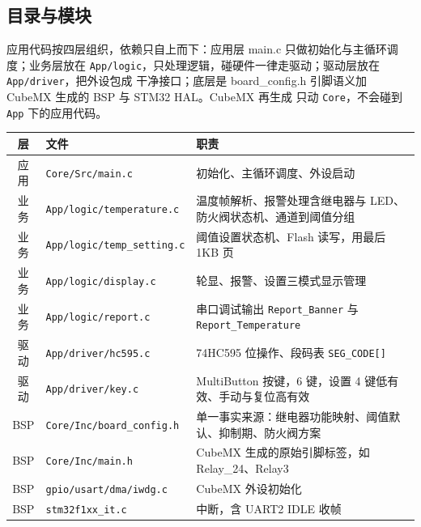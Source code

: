 \documentclass[a4paper,11pt]{ctexart}
\begin{document}
\subsection{目录与模块}
应用代码按四层组织，依赖只自上而下：应用层 main.c 只做初始化与主循环调度；业务层放在
\texttt{App/logic}，只处理逻辑，碰硬件一律走驱动；驱动层放在 \texttt{App/driver}，把外设包成
干净接口；底层是 board\_config.h 引脚语义加 CubeMX 生成的 BSP 与 STM32 HAL。CubeMX 再生成
只动 \texttt{Core}，不会碰到 \texttt{App} 下的应用代码。
\renewcommand{\arraystretch}{1.25}
\begin{center}
\begin{tabular}{|c|l|L{7.0cm}|}
\hline
层 & 文件 & 职责\\
\hline
应用 & \texttt{Core/Src/main.c} & 初始化、主循环调度、外设启动\\
\hline
业务 & \texttt{App/logic/temperature.c} & 温度帧解析、报警处理含继电器与 LED、防火阀状态机、通道到阈值分组\\
\hline
业务 & \texttt{App/logic/temp\_setting.c} & 阈值设置状态机、Flash 读写，用最后 1KB 页\\
\hline
业务 & \texttt{App/logic/display.c} & 轮显、报警、设置三模式显示管理\\
\hline
业务 & \texttt{App/logic/report.c} & 串口调试输出 \texttt{Report\_Banner} 与 \texttt{Report\_Temperature}\\
\hline
驱动 & \texttt{App/driver/hc595.c} & 74HC595 位操作、段码表 \texttt{SEG\_CODE[]}\\
\hline
驱动 & \texttt{App/driver/key.c} & MultiButton 按键，6 键，设置 4 键低有效、手动与复位高有效\\
\hline
BSP & \texttt{Core/Inc/board\_config.h} & 单一事实来源：继电器功能映射、阈值默认、抑制期、防火阀方案\\
\hline
BSP & \texttt{Core/Inc/main.h} & CubeMX 生成的原始引脚标签，如 Relay\_24、Relay3\\
\hline
BSP & \texttt{gpio/usart/dma/iwdg.c} & CubeMX 外设初始化\\
\hline
BSP & \texttt{stm32f1xx\_it.c} & 中断，含 UART2 IDLE 收帧\\
\hline
\end{tabular}
\end{center}
\renewcommand{\arraystretch}{1.0}
\end{document}
